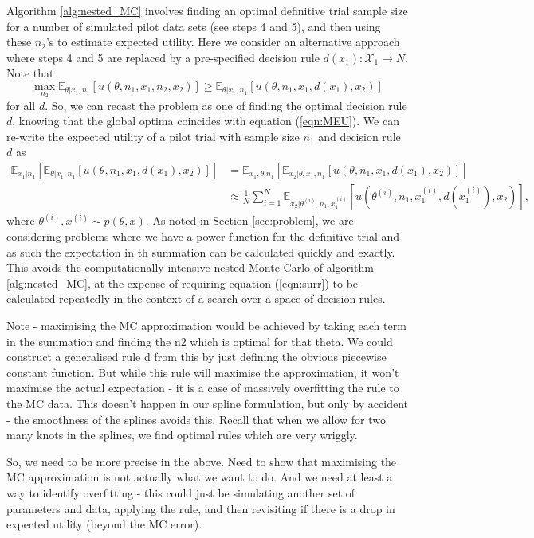 \documentclass[sagev, Crown]{sagej} %
\begin{document}
Algorithm \ref{alg:nested_MC} involves finding an optimal definitive trial sample size for a number of simulated pilot data sets (see steps 4 and 5), and then using these $n_2$'s to estimate expected utility. Here we consider an alternative approach where steps 4 and 5 are replaced by a pre-specified decision rule $d(x_1): \mathcal{X}_1 \rightarrow N$. Note that
$$
\max_{n_2} \mathbb{E}_{\theta | x_1, n_1}[ u(\theta, n_1, x_1, n_2, x_2)] \geq \mathbb{E}_{\theta | x_1, n_1}[ u(\theta, n_1, x_1, d(x_1), x_2)] 
$$
for all $d$. So, we can recast the problem as one of finding the optimal decision rule $d$, knowing that the global optima coincides with equation (\ref{eqn:MEU}). We can re-write the expected utility of a pilot trial with sample size $n_1$ and decision rule $d$ as
\begin{align}\label{eqn:surr}
\mathbb{E}_{x_1 | n_1} \left[ \mathbb{E}_{\theta | x_1, n_1}[ u(\theta, n_1, x_1, d(x_1), x_2)] \right]
& = \mathbb{E}_{x_1, \theta | n_1} \left[ \mathbb{E}_{x_2 | \theta, x_1, n_1} [ u(\theta, n_1, x_1, d(x_1), x_2)] \right] \nonumber \\
& \approx \frac{1}{N} \sum_{i=1}^{N} \mathbb{E}_{x_2 | \theta^{(i)}, n_1, x_1^{(i)}}[ u(\theta^{(i)}, n_1, x_1^{(i)}, d(x_1^{(i)}), x_2) ],
\end{align}
where $\theta^{(i)}, x^{(i)} \sim p(\theta, x)$. As noted in Section \ref{sec:problem}, we are considering problems where we have a power function for the definitive trial and as such the expectation in th summation can be calculated quickly and exactly. This avoids the computationally intensive nested Monte Carlo of algorithm \ref{alg:nested_MC}, at the expense of requiring equation (\ref{eqn:surr}) to be calculated repeatedly in the context of a search over a space of decision rules.

Note - maximising the MC approximation would be achieved by taking each term in the summation and finding the n2 which is optimal for that theta. We could construct a generalised rule d from this by just defining the obvious piecewise constant function. But while this rule will maximise the approximation, it won't maximise the actual expectation - it is a case of massively overfitting the rule to the MC data. This doesn't happen in our spline formulation, but only by accident - the smoothness of the splines avoids this. Recall that when we allow for two many knots in the splines, we find optimal rules which are very wriggly.

So, we need to be more precise in the above. Need to show that maximising the MC approximation is not actually what we want to do. And we need at least a way to identify overfitting - this could just be simulating another set of parameters and data, applying the rule, and then revisiting if there is a drop in expected utility (beyond the MC error). 
\end{document}
